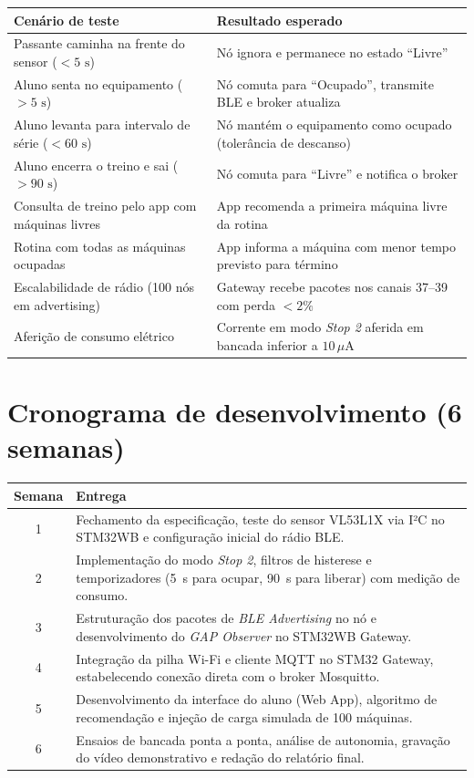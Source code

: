 \documentclass[11pt,a4paper]{article}
\begin{document}
\noindent
\begin{tabularx}{\linewidth}{|X|X|}
\hline
\textbf{Cenário de teste} & \textbf{Resultado esperado} \\ \hline
Passante caminha na frente do sensor ($< 5\text{ s}$) & Nó ignora e permanece no estado ``Livre'' \\ \hline
Aluno senta no equipamento ($> 5\text{ s}$) & Nó comuta para ``Ocupado'', transmite BLE e broker atualiza \\ \hline
Aluno levanta para intervalo de série ($< 60\text{ s}$) & Nó mantém o equipamento como ocupado (tolerância de descanso) \\ \hline
Aluno encerra o treino e sai ($> 90\text{ s}$) & Nó comuta para ``Livre'' e notifica o broker \\ \hline
Consulta de treino pelo app com máquinas livres & App recomenda a primeira máquina livre da rotina \\ \hline
Rotina com todas as máquinas ocupadas & App informa a máquina com menor tempo previsto para término \\ \hline
Escalabilidade de rádio (100 nós em advertising) & Gateway recebe pacotes nos canais 37--39 com perda $< 2\%$ \\ \hline
Aferição de consumo elétrico & Corrente em modo \emph{Stop 2} aferida em bancada inferior a $10\,\mu\text{A}$ \\ \hline
\end{tabularx}

\section{Cronograma de desenvolvimento (6 semanas)}

\noindent
\begin{tabularx}{\linewidth}{|c|X|}
\hline
\textbf{Semana} & \textbf{Entrega} \\ \hline
1 & Fechamento da especificação, teste do sensor VL53L1X via I²C no STM32WB e configuração inicial do rádio BLE. \\ \hline
2 & Implementação do modo \emph{Stop 2}, filtros de histerese e temporizadores (5~s para ocupar, 90~s para liberar) com medição de consumo. \\ \hline
3 & Estruturação dos pacotes de \emph{BLE Advertising} no nó e desenvolvimento do \emph{GAP Observer} no STM32WB Gateway. \\ \hline
4 & Integração da pilha Wi-Fi e cliente MQTT no STM32 Gateway, estabelecendo conexão direta com o broker Mosquitto. \\ \hline
5 & Desenvolvimento da interface do aluno (Web App), algoritmo de recomendação e injeção de carga simulada de 100 máquinas. \\ \hline
6 & Ensaios de bancada ponta a ponta, análise de autonomia, gravação do vídeo demonstrativo e redação do relatório final. \\ \hline
\end{tabularx}
\end{document}
